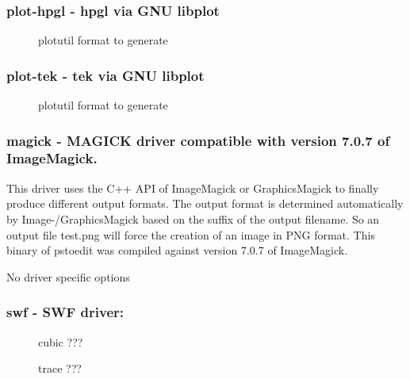 \documentclass[english,a4paper]{article}
\begin{document}
\subsubsection{plot-hpgl - hpgl via GNU libplot}
\begin{description}
\item[]
plotutil format to generate


\end{description}
\subsubsection{plot-tek - tek via GNU libplot}
\begin{description}
\item[]
plotutil format to generate


\end{description}
\subsubsection{magick - MAGICK driver compatible with version 7.0.7 of ImageMagick.}
This driver uses the C++ API of ImageMagick or GraphicsMagick to finally produce different output formats. The output format is determined automatically by Image-/GraphicsMagick based on the suffix of the output filename. So an output file test.png will force the creation of an image in PNG format. This binary of pstoedit was compiled against version 7.0.7 of ImageMagick.

No driver specific options
\subsubsection{swf - SWF driver: }
\begin{description}
\item[]
cubic ???


\item[]
trace ???


\end{description}
\end{document}
